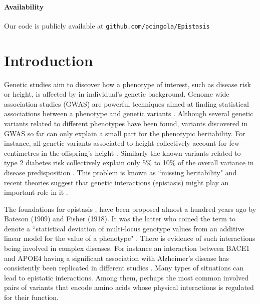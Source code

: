 \paragraph{Availability} Our code is publicly available at \texttt{github.com/pcingola/Epistasis}

\section{Introduction}

Genetic studies aim to discover how a phenotype of interest, such as disease risk or height, is affected by in individual's genetic background. Genome wide association studies (GWAS) are powerful techniques aimed at finding statistical associations between a phenotype and genetic variants \cite{clarke2011basic}. Although several genetic variants related to different phenotypes have been found, variants discovered in GWAS so far can only explain a small part for the phenotypic heritability. For instance, all genetic variants associated to height collectively account for few centimetres in the offspring's height \cite{wood2014defining}. Similarly the known variants related to type 2 diabetes risk collectively explain only 5\% to 10\% of the overall variance in disease predisposition \cite{morris2012large, consortium2014genome}. This problem is known as ``missing heritability" \cite{manolio2009finding} and recent theories suggest that genetic interactions (epistasis) might play an important role in it \cite{zuk2012mystery, zuk2014searching}.

The foundations for epistasis \cite{gao2010classification}, have been proposed almost a hundred years ago by Bateson (1909) and Fisher (1918). It was the latter who coined the term to denote a ``statistical deviation of multi-locus genotype values from an additive linear model for the value of a phenotype" \cite{gao2010classification}. There is evidence of such interactions being involved in complex diseases. For instance an interaction between BACE1 and APOE4 having a significant association with Alzheimer's disease has consistently been replicated in different studies \cite{combarros2009epistasis}. Many types of situations can lead to epistatic interactions. Among them, perhaps the most common involved pairs of variants that encode amino acids whose physical interactions is regulated for their function.

